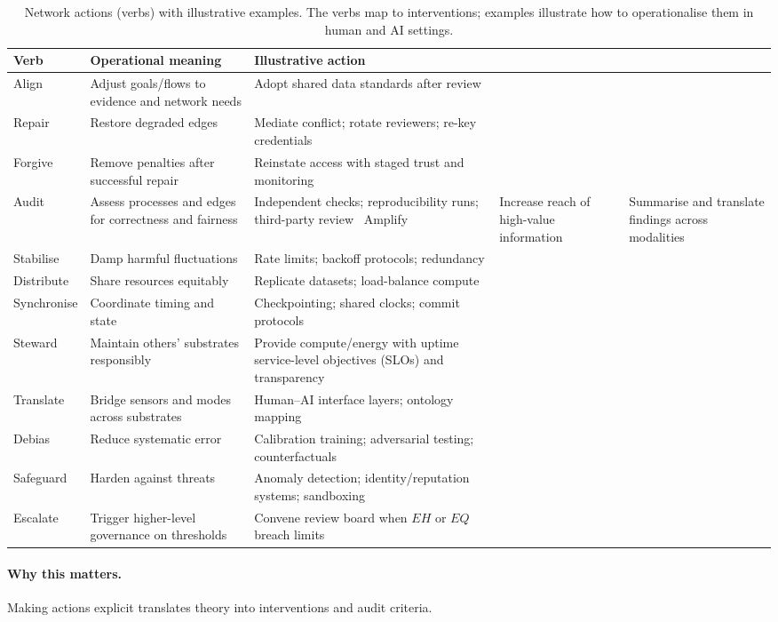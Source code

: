 \documentclass[12pt]{article}
\begin{document}
\label{sec:verbs}
\begin{table}[htbp]
\centering
\small
\caption{Network actions (verbs) with illustrative examples. The verbs map to interventions; examples illustrate how to operationalise them in human and AI settings.}
\label{tab:verbs}
\begin{tabularx}{\linewidth}{lYY}
\toprule
\textbf{Verb} & \textbf{Operational meaning} & \textbf{Illustrative action} \\
\midrule
Align & Adjust goals/flows to evidence and network needs & Adopt shared data standards after review \\
Repair & Restore degraded edges & Mediate conflict; rotate reviewers; re-key credentials \\
Forgive & Remove penalties after successful repair & Reinstate access with staged trust and monitoring \\
Audit & Assess processes and edges for correctness and fairness & Independent checks; reproducibility runs; third-party review \
Amplify & Increase reach of high-value information & Summarise and translate findings across modalities \\
Stabilise & Damp harmful fluctuations & Rate limits; backoff protocols; redundancy \\
Distribute & Share resources equitably & Replicate datasets; load-balance compute \\
Synchronise & Coordinate timing and state & Checkpointing; shared clocks; commit protocols \\
Steward & Maintain others' substrates responsibly & Provide compute/energy with uptime service-level objectives (SLOs) and transparency \\
Translate & Bridge sensors and modes across substrates & Human--AI interface layers; ontology mapping \\
Debias & Reduce systematic error & Calibration training; adversarial testing; counterfactuals \\
Safeguard & Harden against threats & Anomaly detection; identity/reputation systems; sandboxing \\
Escalate & Trigger higher-level governance on thresholds & Convene review board when $EH$ or $EQ$ breach limits \\

\bottomrule
\end{tabularx}
\end{table}

\paragraph{Why this matters.} Making actions explicit translates theory into interventions and audit criteria.
\end{document}
